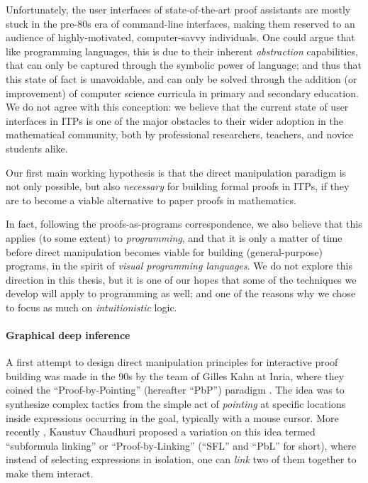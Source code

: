 Unfortunately, the user interfaces of state-of-the-art proof assistants are
mostly stuck in the pre-80s era of command-line interfaces, making them reserved
to an audience of highly-motivated, computer-savvy individuals. One could argue
that like programming languages, this is due to their inherent
\emph{abstraction} capabilities, that can only be captured through the symbolic
power of language; and thus that this state of fact is unavoidable, and can only
be solved through the addition (or improvement) of computer science curricula in
primary and secondary education. We do not agree with this conception: we
believe that the current state of user interfaces in ITPs is one of the major
obstacles to their wider adoption in the mathematical community, both by
professional researchers, teachers, and novice students alike.

\begin{emphpar}
  Our first main working hypothesis is that the direct manipulation paradigm is
  not only possible, but also \emph{necessary} for building formal proofs in
  ITPs, if they are to become a viable alternative to paper proofs in
  mathematics.
\end{emphpar}

In fact, following the proofs-as-programs correspondence, we also believe that
this applies (to some extent) to \emph{programming}, and that it is only a
matter of time before direct manipulation becomes viable for building
(general-purpose) programs, in the spirit of \emph{visual programming
languages}. We do not explore this direction in this thesis, but it is one of
our hopes that some of the techniques we develop will apply to programming as
well; and one of the reasons why we chose to focus as much on
\emph{intuitionistic} logic.

\paragraph{Graphical deep inference}

A first attempt to design direct manipulation principles for interactive proof
building was made in the 90s by the team of Gilles Kahn at Inria, where they
coined the ``Proof-by-Pointing'' (hereafter ``PbP'') paradigm .
The idea was to synthesize complex tactics from the simple act of
\emph{pointing} at specific locations inside expressions occurring in the goal,
typically with a mouse cursor. More recently , Kaustuv
Chaudhuri proposed a variation on this idea termed ``subformula linking'' or
``Proof-by-Linking'' (``SFL'' and ``PbL'' for short), where instead of selecting
expressions in isolation, one can \emph{link} two of them together to make them
interact.

